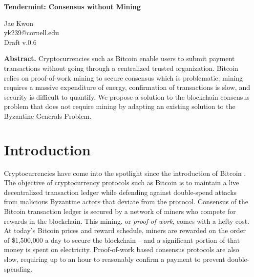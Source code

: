 \documentclass[letter,11pt]{article}
\begin{document}
\begin{center}
    \fontsize{21pt}{24pt}\selectfont \textbf{Tendermint: Consensus without Mining}
\end{center}
\vspace{1mm}  

\begin{center}
Jae Kwon\\
yk239@cornell.edu\\
Draft v.0.6
\end{center}\vspace{1mm}

\begin{center}
    \fontsize{10pt}{12pt}\selectfont
    \parbox{0.8\textwidth}{\textbf{Abstract.} Cryptocurrencies such as Bitcoin enable users to submit payment transactions without going through a centralized trusted organization. Bitcoin relies on proof-of-work mining to secure consensus which is problematic; mining requires a massive expenditure of energy, confirmation of transactions is slow, and security is difficult to quantify. We propose a solution to the blockchain consensus problem that does not require mining by adapting an existing solution to the Byzantine Generals Problem.}
\end{center}

\begin{algorithm}[H]
\end{algorithm}


\section{Introduction} %

Cryptocurrencies have come into the spotlight since the introduction of Bitcoin \cite{conf:nakamoto}. The objective of cryptocurrency protocols such as Bitcoin is to maintain a live decentralized transaction ledger while defending against double-spend attacks from malicious Byzantine actors that deviate from the protocol. Consensus of the Bitcoin transaction ledger is secured by a network of miners who compete for rewards in the blockchain. This mining, or \textit{proof-of-work}, comes with a hefty cost. At today’s Bitcoin prices and reward schedule, miners are rewarded on the order of \$1,500,000 a day to secure the blockchain – and a significant portion of that money is spent on electricity. Proof-of-work based consensus protocols are also slow, requiring up to an hour to reasonably confirm a payment to prevent double-spending.
\end{document}
